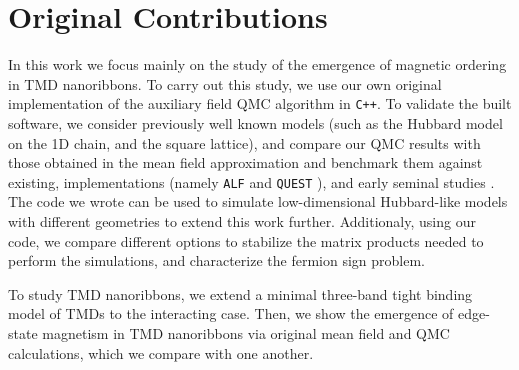 \section{Original Contributions}
\label{sec:int_contributions}

In this work we focus mainly on the study of the emergence of magnetic ordering in \ac{TMD} nanoribbons.
To carry out this study, we use our own original implementation of the auxiliary field \ac{QMC} algorithm in \texttt{C++}.
To validate the built software, we consider previously well known models (such as the Hubbard model on the \acs{1D} chain, and the square lattice), and compare our \ac{QMC} results with those obtained in the mean field approximation and benchmark them against existing,   implementations (namely \texttt{ALF} \cite{bercx_alf_2017} and \texttt{QUEST} \cite{noauthor_quest_2012}), and early seminal studies \cite{hirsch_discrete_1983,white_numerical_1989}.
The code we wrote can be used to simulate low-dimensional Hubbard-like models with different geometries to extend this work further.
Additionaly, using our code, we compare different options to stabilize the matrix products needed to perform the simulations, and characterize the fermion sign problem.

To study \ac{TMD} nanoribbons, we extend a minimal three-band tight binding model \cite{liu_three-band_2013} of \acp{TMD} to the interacting case.
Then, we show the emergence of edge-state magnetism in \ac{TMD} nanoribbons via original mean field and \ac{QMC} calculations, which we compare with one another.